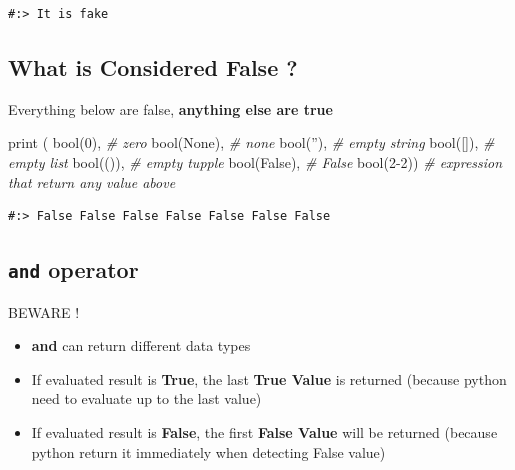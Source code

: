 \documentclass[
]{book}
\newenvironment{Shaded}{\begin{snugshade}}{\end{snugshade}}
\newcommand{\BuiltInTok}[1]{#1}
\newcommand{\CommentTok}[1]{\textcolor[rgb]{0.37,0.37,0.37}{\textit{#1}}}
\newcommand{\DecValTok}[1]{\textcolor[rgb]{0.06,0.06,0.06}{#1}}
\newcommand{\NormalTok}[1]{#1}
\newcommand{\StringTok}[1]{\textcolor[rgb]{0.5,0.5,0.5}{#1}}
\newcommand{\VariableTok}[1]{\textcolor[rgb]{0,0,0}{#1}}
\providecommand{\tightlist}{%
  \setlength{\itemsep}{0pt}\setlength{\parskip}{0pt}}
\begin{document}
\begin{verbatim}
#:> It is fake
\end{verbatim}

\hypertarget{what-is-considered-false}{%
\subsection{What is Considered False ?}\label{what-is-considered-false}}

Everything below are false, \textbf{anything else are true}

\begin{Shaded}
\begin{Highlighting}[]
\BuiltInTok{print}\NormalTok{ ( }\BuiltInTok{bool}\NormalTok{(}\DecValTok{0}\NormalTok{),      }\CommentTok{# zero}
        \BuiltInTok{bool}\NormalTok{(}\VariableTok{None}\NormalTok{),  }\CommentTok{# none}
        \BuiltInTok{bool}\NormalTok{(}\StringTok{''}\NormalTok{),    }\CommentTok{# empty string}
        \BuiltInTok{bool}\NormalTok{([]),    }\CommentTok{# empty list}
        \BuiltInTok{bool}\NormalTok{(()),    }\CommentTok{# empty tupple}
        \BuiltInTok{bool}\NormalTok{(}\VariableTok{False}\NormalTok{), }\CommentTok{# False}
        \BuiltInTok{bool}\NormalTok{(}\DecValTok{2-2}\NormalTok{))    }\CommentTok{# expression that return any value above}
\end{Highlighting}
\end{Shaded}

\begin{verbatim}
#:> False False False False False False False
\end{verbatim}

\hypertarget{and-operator}{%
\subsection{\texorpdfstring{\texttt{and} operator}{and operator}}\label{and-operator}}

BEWARE !

\begin{itemize}
\tightlist
\item
  \textbf{and} can return different data types\\
\item
  If evaluated result is \textbf{True}, the last \textbf{True Value} is returned (because python need to evaluate up to the last value)\\
\item
  If evaluated result is \textbf{False}, the first \textbf{False Value} will be returned (because python return it immediately when detecting False value)
\end{itemize}
\end{document}
